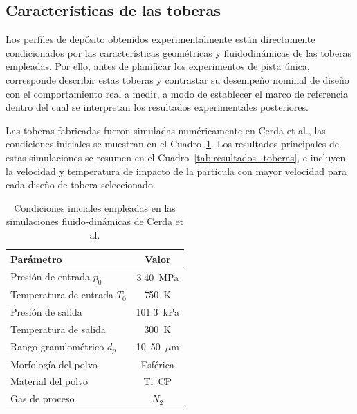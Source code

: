 \subsection{Características de las toberas}

Los perfiles de depósito obtenidos experimentalmente están directamente condicionados por las características geométricas y fluidodinámicas de las toberas empleadas. Por ello, antes de planificar los experimentos de pista única, corresponde describir estas toberas y contrastar su desempeño nominal de diseño con el comportamiento real a medir, a modo de establecer el marco de referencia dentro del cual se interpretan los resultados experimentales posteriores.

Las toberas fabricadas fueron simuladas numéricamente en Cerda et al., las
condiciones iniciales se muestran en el Cuadro~\ref{tab:condiciones_cerda}. Los resultados
principales de estas simulaciones se resumen en el Cuadro~\ref{tab:resultados_toberas},
e incluyen la velocidad y temperatura de impacto de la partícula con mayor velocidad para cada
diseño de tobera seleccionado.

\begin{table}[h]
	\centering
	\caption[Condiciones iniciales empleadas en las simulaciones 
	fluido-dinámicas de Cerda et al]{Condiciones iniciales empleadas en las simulaciones 
		fluido-dinámicas de Cerda et al.}
	\label{tab:condiciones_cerda}
	\begin{tabular}{lc}
		\hline
		\textbf{Parámetro} & \textbf{Valor} \\
		\hline
		Presión de entrada $p_0$       & \SI{3.40}{MPa}       \\
		Temperatura de entrada $T_0$   & \SI{750}{K}          \\
		Presión de salida              & \SI{101.3}{kPa}      \\
		Temperatura de salida          & \SI{300}{K}          \\
		Rango granulométrico $d_p$     & 10--50~$\mu$m        \\
		Morfología del polvo           & Esférica             \\
		Material del polvo             & Ti~CP                \\
		Gas de proceso & $N_{2}$ \\
		\hline
	\end{tabular}
\end{table}

